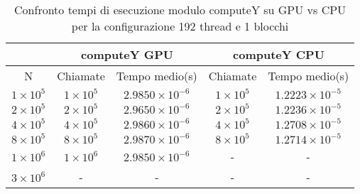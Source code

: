 \begin{table}[ht!]
    \begin{center}
        \renewcommand{\arraystretch}{1.5}
        \begin{adjustbox}{width=.65\textwidth}
            \begin{tabular}{ |c|c|c|c|c| }
                \hline
                \multicolumn{1}{|c}{} & \multicolumn{2}{|c}{computeY GPU} & \multicolumn{2}{|c|}{computeY CPU} \\
                \hline
                 N & Chiamate & Tempo medio(s) & Chiamate & Tempo medio(s) \\
                \hline 
                $1 \times 10^5$ & $1 \times 10^{5}$ & $2.9850 \times 10^{-6}$ & $1 \times 10^{5}$ & $1.2223 \times 10^{-5}$ \\ 
                \hline 
                $2 \times 10^5$ & $2 \times 10^{5}$ & $2.9650 \times 10^{-6}$ & $2 \times 10^{5}$ & $1.2236 \times 10^{-5}$ \\ 
                \hline 
                $4 \times 10^5$ & $4 \times 10^{5}$ & $2.9860 \times 10^{-6}$ & $4 \times 10^{5}$ & $1.2708 \times 10^{-5}$ \\ 
                \hline
                $8 \times 10^5$ & $8 \times 10^{5}$ & $2.9870 \times 10^{-6}$ & $8 \times 10^{5}$ & $1.2714 \times 10^{-5}$ \\ 
                \hline 
                $1 \times 10^6$ & $1 \times 10^{6}$ & $2.9850 \times 10^{-6}$ & - & - \\ 
                \hline 
                $3 \times 10^6$ & - & - & - & - \\ 
                \hline 
            \end{tabular}
        \end{adjustbox}
    \end{center}
    \caption{Confronto tempi di esecuzione modulo computeY su GPU vs CPU per la configurazione 192 thread e 1 blocchi}
    \label{tab:computeY_kernel_table_192x1}
\end{table}

